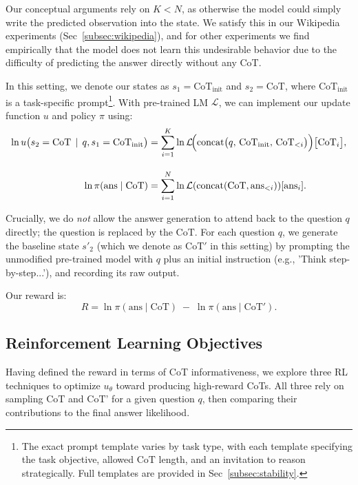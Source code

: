 \documentclass{article}
\begin{document}
Our conceptual arguments rely on $K < N$, as otherwise the model could simply write the predicted observation into the state. We satisfy this in our Wikipedia experiments (Sec~\ref{subsec:wikipedia}), and for other experiments we find empirically that the model does not learn this undesirable behavior due to the difficulty of predicting the answer directly without any CoT.

In this setting, we denote our states as $s_1 = \text{CoT}_{\text{init}}$ and $s_2 = \text{CoT}$, where $\text{CoT}_{\text{init}}$ is a task-specific prompt\footnote{The exact prompt template varies by task type, with each template specifying the task objective, allowed $\text{CoT}$ length, and an invitation to reason strategically. Full templates are provided in Sec~\ref{subsec:stability}.}. With pre-trained LM $\mathcal{L}$, we can implement our update function $u$ and policy $\pi$ using:
\begin{align}
\ln u\bigl(s_2 = \text{CoT} \,\mid\, q, s_1 = \text{CoT}_{\text{init}}\bigr) &= 
\sum_{i=1}^{K}
    \ln \mathcal{L}\!\Bigl(\text{concat}\bigl(q,\,
    \text{CoT}_{\text{init}},\, \text{CoT}_{<i}\bigr)\Bigr)\bigl[\text{CoT}_i\bigr], \\[1em]
\ln \pi(\text{ans} \mid \text{CoT}) &=  \sum_{i=1}^{N} \ln \mathcal{L}(\text{concat}(\text{CoT}, \text{ans}_{<i})) [\text{ans}_i].
\end{align}

Crucially, we do \emph{not} allow the answer generation to attend back to the question $q$ directly; the question is replaced by the $\text{CoT}$. For each question $q$, we generate the baseline state $s'_2$ (which we denote as $\text{CoT}'$ in this setting) by prompting the unmodified pre-trained model with $q$ plus an initial instruction (e.g., 'Think step-by-step...'), and recording its raw output.

Our reward is:
\[
R = \ln \pi(\text{ans} \mid \text{CoT}) \;-\; \ln \pi(\text{ans} \mid \text{CoT}').
\]

\subsection{Reinforcement Learning Objectives}
\label{subsec:rl_objectives}
Having defined the reward in terms of CoT informativeness, we explore three RL techniques to optimize $u_\theta$ toward producing high-reward CoTs. All three rely on sampling $\text{CoT}$ and $\text{CoT'}$ for a given question $q$, then comparing their contributions to the final answer likelihood. 
\end{document}
